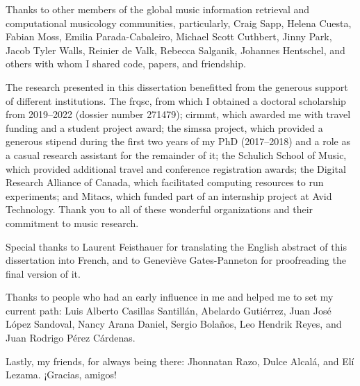 Thanks to other members of the global music information
retrieval and computational musicology communities,
particularly, Craig Sapp, Helena Cuesta, Fabian Moss, Emilia
Parada-Cabaleiro, Michael Scott Cuthbert, Jinny Park, Jacob
Tyler Walls, Reinier de Valk, Rebecca Salganik, Johannes
Hentschel, and others with whom I shared code, papers, and
friendship.

The research presented in this dissertation benefitted from
the generous support of different institutions. The
\gls{frqsc}, from which I obtained a doctoral scholarship
from 2019--2022 (dossier number 271479); \gls{cirmmt}, which
awarded me with travel funding and a student project award;
the \gls{simssa} project, which provided a generous stipend
during the first two years of my PhD (2017--2018) and a role
as a casual research assistant for the remainder of it; the
Schulich School of Music, which provided additional travel
and conference registration awards; the Digital Research
Alliance of Canada, which facilitated computing resources to
run experiments; and Mitacs, which funded part of an
internship project at Avid Technology. Thank you to all of
these wonderful organizations and their commitment to music
research.

Special thanks to Laurent Feisthauer for translating the
English abstract of this dissertation into French, and to
Genevi\`eve Gates-Panneton for proofreading the final
version of it.

Thanks to people who had an early influence in me and helped
me to set my current path: Luis Alberto Casillas
Santill\'an, Abelardo Guti\'errez, Juan Jos\'e L\'opez
Sandoval, Nancy Arana Daniel, Sergio Bola\~nos, Leo Hendrik
Reyes, and Juan Rodrigo P\'erez C\'ardenas.

Lastly, my friends, for always being there: Jhonnatan Razo,
Dulce Alcal\'a, and El\'i Lezama. ¡Gracias, amigos!
